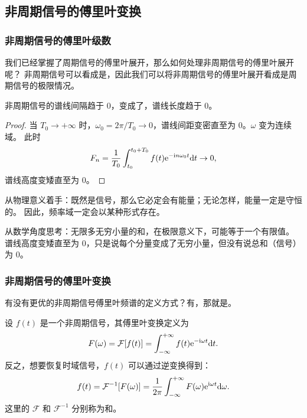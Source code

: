 \subsection{非周期信号的傅里叶变换}

\subsubsection{非周期信号的傅里叶级数}

我们已经掌握了周期信号的傅里叶展开，那么如何处理非周期信号的傅里叶展开呢？
非周期信号可以看成是，因此我们可以将非周期信号的傅里叶展开看成是周期信号的极限情况。

\begin{property}[非周期信号频谱性质]
    非周期信号的谱线间隔趋于 $0$，变成了，谱线长度趋于 $0$。
\end{property}

\begin{proof}
    当 $T_0 \to +\infty$ 时，$\omega_0 = 2\pi / T_0 \to 0$，谱线间距变密直至为 $0$。$\omega$ 变为连续域。
    此时
    \begin{align*}
        F_n = \frac{1}{T_0}\int_{t_0}^{t_0 + T_0}f(t)\mathrm{e}^{-\mathrm{i} n\omega_0 t} \mathrm{d}t \to 0,
    \end{align*}
    谱线高度变矮直至为 $0$。
\end{proof}

\begin{remark}
    从物理意义着手：既然是信号，那么它必定会有能量；无论怎样，能量一定是守恒的。
    因此，频率域一定会以某种形式存在。

    从数学角度思考：无限多无穷小量的和，在极限意义下，可能等于一个有限值。
    谱线高度变矮直至为 $0$，只是说每个分量变成了无穷小量，但没有说总和（信号）为 $0$。
\end{remark}

\subsubsection{非周期信号的傅里叶变换}

有没有更优的非周期信号傅里叶频谱的定义方式？有，那就是。

\begin{definition}[非周期信号的傅里叶变换]
    设 $f(t)$ 是一个非周期信号，其傅里叶变换定义为
    \begin{equation}
        F(\omega) = \mathcal{F}[f(t)] = \int_{-\infty}^{+\infty}f(t)\mathrm{e}^{-\mathrm{i}\omega t} \mathrm{d}t.
    \end{equation}
    反之，想要恢复时域信号，$f(t)$ 可以通过逆变换得到：
    \begin{equation}
        f(t) = \mathcal{F}^{-1}[F(\omega)] = \frac{1}{2\pi}\int_{-\infty}^{+\infty}F(\omega)\mathrm{e}^{\mathrm{i}\omega t} \mathrm{d}\omega.
    \end{equation}
    这里的 $\mathcal{F}$ 和 $\mathcal{F}^{-1}$ 分别称为和。
\end{definition}

